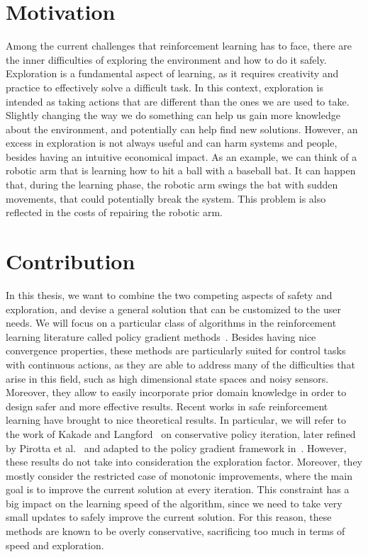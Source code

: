 \section{Motivation}

Among the current challenges that reinforcement learning has to face, there are the inner difficulties of exploring the environment and how to do it safely. Exploration is a fundamental aspect of learning, as it requires creativity and practice to effectively solve a difficult task. In this context, exploration is intended as taking actions that are different than the ones we are used to take. Slightly changing the way we do something can help us gain more knowledge about the environment, and potentially can help find new solutions. However, an excess in exploration is not always useful and can harm systems and people, besides having an intuitive economical impact. As an example, we can think of a robotic arm that is learning how to hit a ball with a baseball bat. It can happen that, during the learning phase, the robotic arm swings the bat with sudden movements, that could potentially break the system. This problem is also reflected in the costs of repairing the robotic arm.

\section{Contribution}

In this thesis, we want to combine the two competing aspects of safety and exploration, and devise a general solution that can be customized to the user needs. We will focus on a particular class of algorithms in the reinforcement learning literature called policy gradient methods~\cite{peters}. Besides having nice convergence properties, these methods are particularly suited for control tasks with continuous actions, as they are able to address many of the difficulties that arise in this field, such as high dimensional state spaces and noisy sensors. Moreover, they allow to easily incorporate prior domain knowledge in order to design safer and more effective results. Recent works in safe reinforcement learning have brought to nice theoretical results. In particular, we will refer to the work of Kakade and Langford~\cite{Kakade02approximatelyoptimal} on conservative policy iteration, later refined by Pirotta et al.~\cite{safe_iteration} and adapted to the policy gradient framework in~\cite{adaptive_step}. However, these results do not take into consideration the exploration factor. Moreover, they mostly consider the restricted case of monotonic improvements, where the main goal is to improve the current solution at every iteration. This constraint has a big impact on the learning speed of the algorithm, since we need to take very small updates to safely improve the current solution. For this reason, these methods are known to be overly conservative, sacrificing too much in terms of speed and exploration. 

